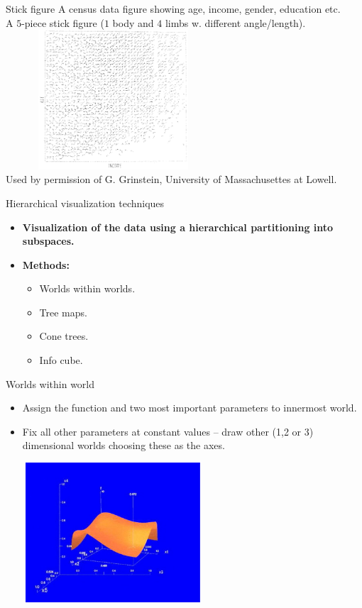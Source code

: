\documentclass[aspectratio=169,t]{beamer}
\begin{document}
  { 
    \begin{frame}{Stick figure}
    A census data figure showing age, income, gender, education etc. \\
    A $5$-piece stick figure ($1$ body and $4$ limbs w. different angle/length).\\[0.1cm]
    \centering
    \includegraphics[width=8cm, height=5.2cm]{img/stick_figure.png}\\
    \tiny{Used by permission of G. Grinstein, University of Massachusettes at Lowell.}
    \end{frame}
  }

  { 
    \begin{frame}{Hierarchical visualization techniques}
    \centering
    \begin{itemize}
      \item \textbf{Visualization of the data using a hierarchical partitioning into subspaces.}
      \item \textbf{Methods:}
      \begin{itemize}
        \item Worlds within worlds.
        \item Tree maps.
        \item Cone trees.
        \item Info cube.
      \end{itemize}
    \end{itemize}
    \end{frame}
  }

  { 
    \begin{frame}{Worlds within world}
    \begin{itemize}
      \item Assign the function and two most important parameters to innermost world.
      \item Fix all other parameters at constant values -- draw other (1,2 or 3) dimensional worlds choosing these as the axes.
    \end{itemize}
    \centering
    \includegraphics[width=8cm,height=5.2cm]{img/www.jpg}
    \end{frame}
  }
\end{document}
